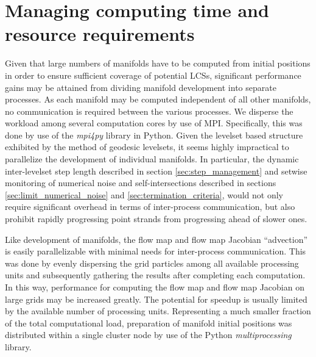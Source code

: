 

\section{Managing computing time and resource requirements}\label{sec:resource_requirements}

Given that large numbers of manifolds have to be computed from initial positions in order to ensure sufficient coverage of potential LCSs, significant performance gains may be attained from dividing manifold development into separate processes. As each manifold may be computed independent of all other manifolds, no communication is required between the various processes. We disperse the workload among several computation cores by use of MPI. Specifically, this was done by use of the \textit{mpi4py} library in Python. Given the levelset based structure exhibited by the method of geodesic levelsets, it seems highly impractical to parallelize the development of individual manifolds. In particular, the dynamic inter-levelset step length described in section \ref{sec:step_management} and setwise monitoring of numerical noise and self-intersections described in sections \ref{sec:limit_numerical_noise} and \ref{sec:termination_criteria}, would not only require significant overhead in terms of inter-process communication, but also prohibit rapidly progressing point strands from progressing ahead of slower ones.

Like development of manifolds, the flow map and flow map Jacobian ``advection'' is easily parallelizable with minimal needs for inter-process communication. This was done by evenly dispersing the grid particles among all available processing units and subsequently gathering the results after completing each computation. In this way, performance for computing the flow map and flow map Jacobian on large grids may be increased greatly. The potential for speedup is usually limited by the available number of processing units. Representing a much smaller fraction of the total computational load, preparation of manifold initial positions was distributed within a single cluster node by use of the Python \textit{multiprocessing} library. 

